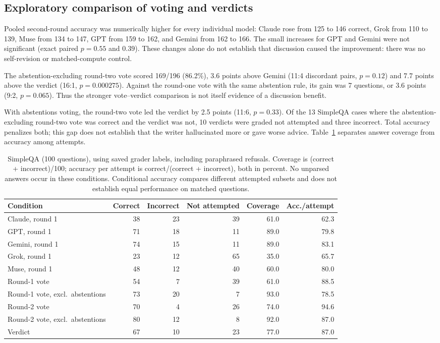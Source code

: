 \documentclass[11pt]{article}
\begin{document}
\subsection{Exploratory comparison of voting and verdicts}
\label{sec:verdict}
Pooled second-round accuracy was numerically higher for every individual model: Claude rose from 125 to 146 correct, Grok from 110 to 139, Muse from 134 to 147, GPT from 159 to 162, and Gemini from 162 to 166. The small increases for GPT and Gemini were not significant (exact paired $p=0.55$ and $0.39$). These changes alone do not establish that discussion caused the improvement: there was no self-revision or matched-compute control.

The abstention-excluding round-two vote scored 169/196 (86.2\%), 3.6 points above Gemini (11:4 discordant pairs, $p=0.12$) and 7.7 points above the verdict (16:1, $p=0.000275$). Against the round-one vote with the same abstention rule, its gain was 7 questions, or 3.6 points (9:2, $p=0.065$). Thus the stronger vote--verdict comparison is not itself evidence of a discussion benefit.

With abstentions voting, the round-two vote led the verdict by 2.5 points (11:6, $p=0.33$). Of the 13 SimpleQA cases where the abstention-excluding round-two vote was correct and the verdict was not, 10 verdicts were graded not attempted and three incorrect. Total accuracy penalizes both; this gap does not establish that the writer hallucinated more or gave worse advice. Table~\ref{tab:coverage} separates answer coverage from accuracy among attempts.

\begin{table}[t]
\centering
\small
\begin{tabular}{lrrrrr}
\toprule
Condition & Correct & Incorrect & Not attempted & Coverage & Acc./attempt \\
\midrule
Claude, round 1 & 38 & 23 & 39 & 61.0 & 62.3 \\
GPT, round 1 & 71 & 18 & 11 & 89.0 & 79.8 \\
Gemini, round 1 & 74 & 15 & 11 & 89.0 & 83.1 \\
Grok, round 1 & 23 & 12 & 65 & 35.0 & 65.7 \\
Muse, round 1 & 48 & 12 & 40 & 60.0 & 80.0 \\
\midrule
Round-1 vote & 54 & 7 & 39 & 61.0 & 88.5 \\
Round-1 vote, excl.\ abstentions & 73 & 20 & 7 & 93.0 & 78.5 \\
Round-2 vote & 70 & 4 & 26 & 74.0 & 94.6 \\
Round-2 vote, excl.\ abstentions & 80 & 12 & 8 & 92.0 & 87.0 \\
Verdict & 67 & 10 & 23 & 77.0 & 87.0 \\
\bottomrule
\end{tabular}
\caption{SimpleQA (100 questions), using saved grader labels, including paraphrased refusals. Coverage is (correct + incorrect)/100; accuracy per attempt is correct/(correct + incorrect), both in percent. No unparsed answers occur in these conditions. Conditional accuracy compares different attempted subsets and does not establish equal performance on matched questions.}
\label{tab:coverage}
\end{table}
\end{document}
